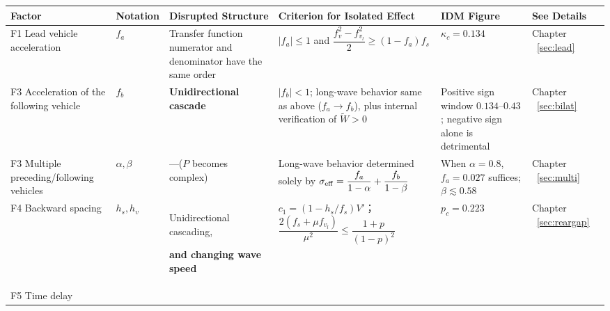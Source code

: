 \documentclass[11pt,a4paper,openany]{book}
\numberwithin{equation}{chapter}
\numberwithin{figure}{chapter}
\numberwithin{table}{chapter}
\begin{document}
\begin{center}
\scriptsize
{}
\label{tab:six-factor-map}
\begin{tabular}{p{1.35cm}p{1.7cm}p{2.35cm}p{4.35cm}p{2.4cm}p{1.0cm}}
\toprule
\textbf{Factor} & \textbf{Notation} & \textbf{Disrupted Structure} & \textbf{Criterion for Isolated Effect} & \textbf{IDM Figure} & \textbf{See Details} \\
\midrule

F1 Lead vehicle acceleration

& $f_a$ &

Transfer function numerator and denominator have the same order&$\left|f_a\right|\le1$ and $\dfrac{f_v^2-f_{v_l}^2}{2}\ge\left(1-f_a\right)f_s$

& $\kappa_c=0.134$ &

Chapter ~\ref{sec:lead}~
\\[8pt]
F3 Acceleration of the following vehicle

& $f_b$ & \textbf{Unidirectional cascade} &

$\left|f_b\right|<1$; long-wave behavior same as above ($f_a\!\to\!f_b$), plus internal verification of $\widetilde W>0$

&

Positive sign window $0.134$–$0.43$; negative sign alone is detrimental

&

Chapter ~\ref{sec:bilat}~
\\[12pt]
F3 Multiple preceding/following vehicles

& $\alpha,\beta$ &

—($P$ becomes complex)

&

Long-wave behavior determined solely by $\sigma_{\rm eff}=\dfrac{f_a}{1-\alpha}+\dfrac{f_b}{1-\beta}$

&

When $\alpha=0.8$, $f_a=0.027$ suffices; $\beta\lesssim0.58$

&

Chapter ~\ref{sec:multi}~
\\[12pt]
F4 Backward spacing& $h_s,h_v$ &Unidirectional cascading,

\textbf{and changing wave speed} & $c_1=\left(1-h_s/f_s\right)V'$；$\dfrac{2(f_s+\mu f_{v_l})}{\mu^2}\le\dfrac{1+p}{(1-p)^2}$ & $p_c=0.223$ &

Chapter ~\ref{sec:reargap}~
\\[10pt]
F5 Time delay


\end{tabular}
\end{center}
\end{document}
